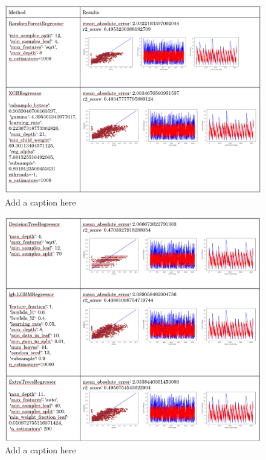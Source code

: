 \documentclass[]{llncs}
\begin{document}

\begin{figure}
	\centering
	\includegraphics[width=1\linewidth]{../GPUProject/Results1.PNG}
	\caption{Add a caption here}
	\label{fig:morethan90percent}
\end{figure}

\begin{figure}
	\centering
	\includegraphics[width=1\linewidth]{../GPUProject/Results2.PNG}
	\caption{Add a caption here}
	\label{fig:morethan90percent}
\end{figure}
\end{document}
